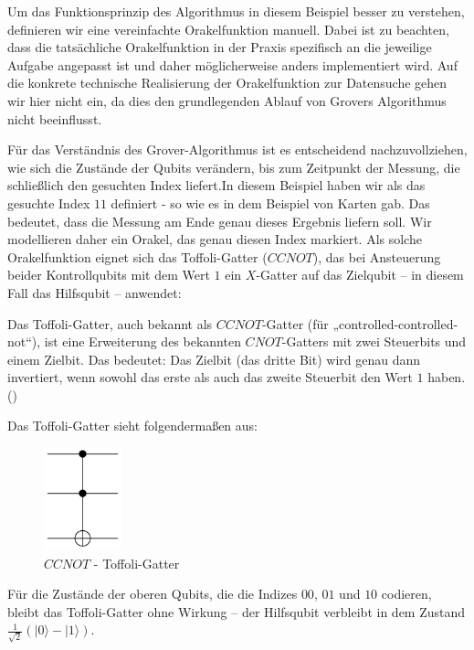 Um das Funktionsprinzip des Algorithmus in diesem Beispiel besser zu verstehen, definieren wir eine vereinfachte Orakelfunktion manuell. Dabei ist zu beachten, dass die tatsächliche Orakelfunktion in der Praxis spezifisch an die jeweilige Aufgabe angepasst ist und daher möglicherweise anders implementiert wird. Auf die konkrete technische Realisierung der Orakelfunktion zur Datensuche gehen wir hier nicht ein, da dies den grundlegenden Ablauf von Grovers Algorithmus nicht beeinflusst.

Für das Verständnis des Grover-Algorithmus ist es entscheidend nachzuvollziehen, wie sich die Zustände der Qubits verändern, bis zum Zeitpunkt der Messung, die schließlich den gesuchten Index liefert.In diesem Beispiel haben wir als das gesuchte Index $11$ definiert - so wie es in dem Beispiel von Karten gab. Das bedeutet, dass die Messung am Ende genau dieses Ergebnis liefern soll. Wir modellieren daher ein Orakel, das genau diesen Index markiert. Als solche Orakelfunktion eignet sich das Toffoli-Gatter ($CCNOT$), das bei Ansteuerung beider Kontrollqubits mit dem Wert $1$ ein $X$-Gatter auf das Zielqubit – in diesem Fall das Hilfsqubit – anwendet:

\begin{definition}
\label{def:toffoli}
Das Toffoli-Gatter, auch bekannt als $CCNOT$-Gatter (für „controlled-controlled-not“), ist eine Erweiterung des bekannten $CNOT$-Gatters mit zwei Steuerbits und einem Zielbit. Das bedeutet: Das Zielbit (das dritte Bit) wird genau dann invertiert, wenn sowohl das erste als auch das zweite Steuerbit den Wert $1$ haben.(\cite{toffoli_proceedings_1980})
\end{definition}

Das Toffoli-Gatter sieht folgendermaßen aus:
\begin{figure}[H]
    \centering
    \includegraphics[width=0.2\textwidth]{images/basic-algorithms/toffoli.png}
    \caption{$CCNOT$ - Toffoli-Gatter}
    \label{fig:toffoli-gate}
\end{figure}

 Für die Zustände der oberen Qubits, die die Indizes $00$, $01$ und $10$ codieren, bleibt das Toffoli-Gatter ohne Wirkung – der Hilfsqubit verbleibt in dem Zustand $\frac{1}{\sqrt{2}}(|0\rangle - |1\rangle)$.\\


